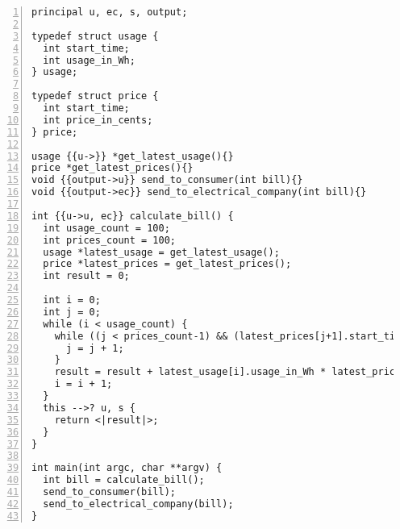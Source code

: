 \begin{lstlisting}[style=dlmc, numbers=left, caption={Inferred labeled smart meter bill calculation example}, label=example:code:calculate_bill-explicit]
principal u, ec, s, output;

typedef struct usage {
  int start_time;
  int usage_in_Wh;
} usage;

typedef struct price {
  int start_time;
  int price_in_cents;
} price;

usage {{u->}} *get_latest_usage(){}
price *get_latest_prices(){}
void {{output->u}} send_to_consumer(int bill){}
void {{output->ec}} send_to_electrical_company(int bill){}

int {{u->u, ec}} calculate_bill() {
  int usage_count = 100;
  int prices_count = 100;
  usage *latest_usage = get_latest_usage();
  price *latest_prices = get_latest_prices();
  int result = 0;

  int i = 0;
  int j = 0;
  while (i < usage_count) {
    while ((j < prices_count-1) && (latest_prices[j+1].start_time <= latest_usage[i].start_time)) {
      j = j + 1;
    }
    result = result + latest_usage[i].usage_in_Wh * latest_prices[j].price_in_cents;
    i = i + 1;
  }
  this -->? u, s {
    return <|result|>;
  }
}

int main(int argc, char **argv) {
  int bill = calculate_bill();
  send_to_consumer(bill);
  send_to_electrical_company(bill);
}
\end{lstlisting}
